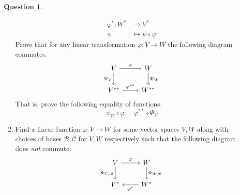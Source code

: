 \documentclass[12pt]{article}
\theoremstyle{plain}
\theoremstyle{definition}
\newtheorem{question}[thm]{Question}
\newcommand{\scr}[1]{\mathscr{#1}}
\newcommand{\lto}{\longrightarrow}
\begin{document}
\begin{question}
\begin{enumerate}
		\begin{align*}
			\varphi^\ast: W^\ast &\lto V^\ast\\
			\psi &\longmapsto \psi \circ \varphi
			\end{align*}
		Prove that for any linear transformation $\varphi: V \lto W$ the following diagram commutes.
		\begin{equation}
			\begin{tikzcd}
				V\arrow[r,"{\varphi}"]\arrow[d,swap,"{\Psi_V}"] & W\arrow[d,"{\Psi_W}"]\\
				V^{\ast\ast}\arrow[r,"{\varphi^{\ast\ast}}"] & W^{\ast\ast}
				\end{tikzcd}
			\end{equation}
		That is, prove the following equality of functions.
		\begin{equation}
			\psi_W \circ \varphi = \varphi^{\ast\ast} \circ \Psi_V
			\end{equation}
		\item Find a linear function $\varphi: V \lto W$ for some vector spaces $V,W$ along with choices of bases $\scr{B},\scr{C}$ for $V,W$ respectively such that the following diagram does \emph{not} commute.
		\begin{equation}
			\begin{tikzcd}
			V\arrow[r,"{\varphi}"]\arrow[d,swap,"{\Phi_{V,\scr{B}}}"] & W\arrow[d,"{\Phi_{W, \scr{C}}}"]\\
			V^\ast & W^\ast\arrow[l,"{\varphi^\ast}"]
			\end{tikzcd}
			\end{equation}
			\end{enumerate}
		\end{question}
	
\end{document}
